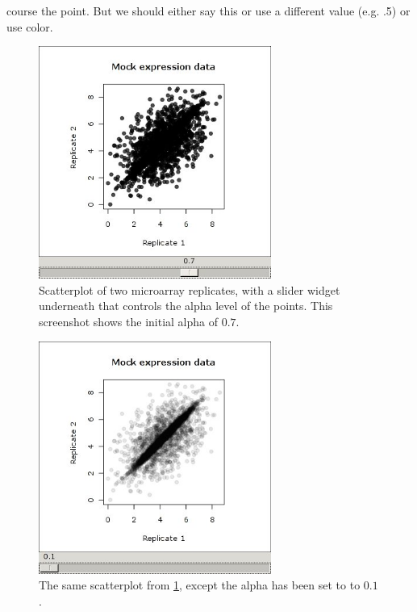 \documentclass[article]{jss}
\begin{document}
course the point. But we should either say this or use a different
value (e.g. .5) or use color.


\begin{figure}
\begin{center}
\includegraphics[width=3in]{demo-alpha-random-07-3}
\caption{\label{fig:rgtk2-demo-initial}Scatterplot of two microarray
replicates,
with a slider widget underneath that controls the alpha level of the
points. This screenshot shows the initial alpha of $0.7$.}
\end{center}
\end{figure}

\begin{figure}
\begin{center}
\includegraphics[width=3in]{demo-alpha-random-01-3}
\caption{\label{fig:rgtk2-demo-final}The same scatterplot from 
\ref{fig:rgtk2-demo-initial}, except the alpha has been set to to
$0.1$.}
\end{center}
\end{figure}
\end{document}
